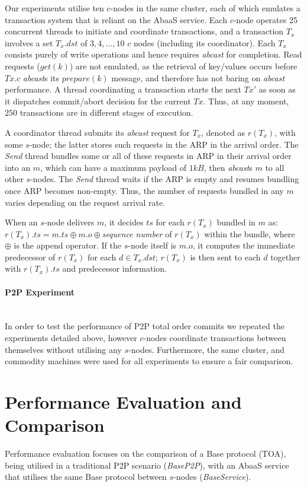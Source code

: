 Our experiments utilise ten $c$-nodes in the same cluster, each of which emulates a transaction system that is reliant on the \textsf{AbaaS} service.  Each $c$-node operates 25 concurrent threads to initiate and coordinate transactions, and a transaction $T_x$ involves a set $T_x.dst$ of $3,4,\ldots,10$ $c$ nodes (including its coordinator). Each $T_x$ consists purely of write operations and hence requires \emph{abcast} for completion. Read requests ($get(k)$) are not emulated, as the retrieval of key/values occurs before $Tx.c$ \emph{abcast}s its $prepare(k)$ message, and therefore has not baring on \emph{abcast} performance.  A thread coordinating a transaction starts the next $Tx'$ as soon as it dispatches commit/abort decision for the current $Tx$. Thus, at any moment, $250$ transactions are in different stages of execution.

A coordinator thread submits its \emph{abcast} request for $T_x$, denoted as $r(T_x)$, with some $s$-node; the latter stores such requests in the ARP in the arrival order. The \emph{Send} thread bundles some or all of these requests in ARP in their arrival order into an $m$, which can have a maximum payload of $1kB$, then \emph{abcast}s $m$ to all other $s$-nodes.  The \emph{Send} thread waits if the ARP is empty and resumes bundling once ARP becomes non-empty. Thus, the number of requests bundled in any $m$ varies depending on the request arrival rate. 

When an $s$-node delivers $m$, it decides $ts$ for each $r(T_x)$ bundled in $m$ as: $r(T_x).ts= m.ts\oplus m.o \oplus$\emph{sequence number} of $r(T_x)$ within the bundle, where $\oplus$ is the append operator. If the $s$-node itself is $m.o$, it computes the immediate predecessor of $r(T_x)$ for each $d \in T_x.dst$; $r(T_x)$ is then sent to each $d$ together with $r(T_x).ts$ and predecessor information.

\paragraph{P2P Experiment} \hspace{0pt} \\
In order to test the performance of P2P total order commits we repeated the  experiments detailed above, however $c$-nodes coordinate transactions between themselves without utilising any $s$-nodes.  Furthermore, the same cluster, and commodity machines were used for all experiments to ensure a fair comparison.   

\section{Performance Evaluation and Comparison}\label{sec:abaas_results}
Performance evaluation focuses on the comparison of a \textsf{Base} protocol (TOA), being utilised in a traditional P2P scenario (\emph{BaseP2P}), with an \textsf{AbaaS} service that utilises the same \textsf{Base} protocol between $s$-nodes (\emph{BaseService}).

